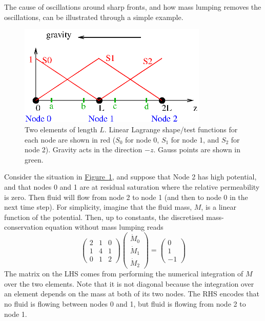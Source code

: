 \documentclass[12pt]{report}
\begin{document}
The cause of oscillations around sharp fronts, and how mass lumping
removes the oscillations, can be illustrated through a simple example.

\begin{figure}[htb]
\centering
\includegraphics[width=9cm]{eg_richards_supg.eps}
\caption{Two elements of length $L$.  Linear Lagrange shape/test
  functions for each node are shown in red ($S_{0}$ for node 0,
  $S_{1}$ for node 1, and $S_{2}$ for node 2).  Gravity acts in the
  direction $-z$.  Gauss points are shown in green.}
\label{eg_richards_supg.fig}
\end{figure}

Consider the situation in
\hyperref[eg_richards_supg.fig]{Figure~\ref*{eg_richards_supg.fig}},
and suppose that Node 2 has high potential, and that nodes 0 and 1 are
at residual saturation where the relative permeability is zero.  Then
fluid will flow from node 2 to node 1 (and then to node 0 in the next
time step).  For simplicity, imagine that the fluid mass, $M$, is a linear
function of the potential.  Then, up to constants, the discretised
mass-conservation equation without mass lumping reads
\begin{equation}
\left(
\begin{array}{ccc}
2 & 1 & 0 \\
1 & 4 & 1 \\
0 & 1 & 2
\end{array}
\right)
\left(
\begin{array}{c}
\dot{M}_{0} \\
\dot{M}_{1} \\
\dot{M}_{2}
\end{array}
\right)
=
\left(
\begin{array}{c}
0 \\
1 \\
-1
\end{array}
\right)
\end{equation}
The matrix on the LHS comes from performing the numerical integration
of $M$ over the two elements.  Note that it is not diagonal
because the integration over an element depends on the mass at
both of its two nodes.  The RHS encodes that no fluid is flowing
between nodes 0 and 1, but fluid is flowing from node 2 to node 1.
\end{document}
